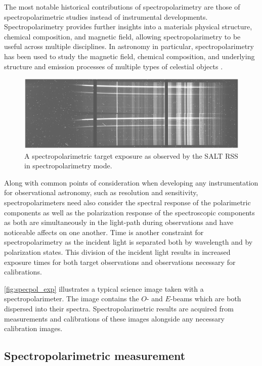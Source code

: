 The most notable historical contributions of spectropolarimetry are those of spectropolarimetric studies instead of instrumental developments. Spectropolarimetry provides further insights into a materials physical structure, chemical composition, and magnetic field, allowing spectropolarimetry to be useful across multiple disciplines. In astronomy in particular, spectropolarimetry has been used to study the magnetic field, chemical composition, and underlying structure and emission processes of multiple types of celestial objects \citep[see for example][]{specpol_AGN, specpol_stars, specpol_SN}.

\begin{figure}[t]
    \centering
    \includegraphics[width=1.0\textwidth]{figures/2_specpol_sci.pdf}
    \caption{A spectropolarimetric target exposure as observed by the \gls{SALT} \gls{RSS} in spectropolarimetry mode.}
    \label{fig:specpol_exp}
\end{figure}

Along with common points of consideration when developing any instrumentation for observational astronomy, such as resolution and sensitivity, spectropolarimeters need also consider the spectral response of the polarimetric components as well as the polarization response of the spectroscopic components as both are simultaneously in the light-path during observations and have noticeable affects on one another. Time is another constraint for spectropolarimetry as the incident light is separated both by wavelength and by polarization states. This division of the incident light results in increased exposure times for both target observations and observations necessary for calibrations.

\autoref{fig:specpol_exp} illustrates a typical science image taken with a spectropolarimeter. The image contains the $O$- and $E$-beams which are both dispersed into their spectra. Spectropolarimetric results are acquired from measurements and calibrations of these images alongside any necessary calibration images.

\subsection{Spectropolarimetric measurement}


